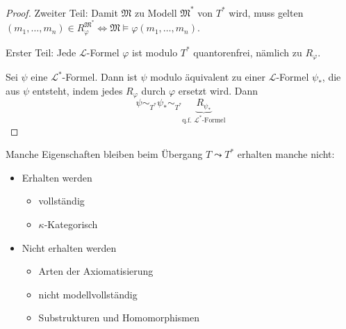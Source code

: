 \documentclass[12pt,parskip=full]{scrartcl}
\theoremstyle{definition}
\begin{document}
	\begin{proof}
		Zweiter Teil: Damit $\mathfrak{M}$ zu Modell $\mathfrak{M}^*$ von $T^*$ wird, muss gelten $(m_1, \dots, m_n) \in R_\varphi^{\mathfrak{M}^*} \Leftrightarrow \mathfrak{M} \models \varphi(m_1, \dots, m_n)$.
		
		Erster Teil: Jede $\mathcal{L}$-Formel $\varphi$ ist modulo $T^*$ quantorenfrei, nämlich zu $R_\varphi$.
		
		Sei $\psi$ eine $\mathcal{L}^*$-Formel. Dann ist $\psi$ modulo äquivalent zu einer $\mathcal{L}$-Formel $\psi_*$, die aus $\psi$ entsteht, indem jedes $R_\varphi$ durch $\varphi$ ersetzt wird. Dann
		\begin{equation*}
			\psi \sim_{T^*} \psi_* \sim_{T^*} \underbrace{R_{\psi_*}}_\text{q.f. $\mathcal{L}^*$-Formel}
		\end{equation*}
	\end{proof}

	Manche Eigenschaften bleiben beim Übergang $T \leadsto T^*$ erhalten manche nicht:
	\begin{itemize}
		\item Erhalten werden
		\begin{itemize}
			\item vollständig
			\item $\kappa$-Kategorisch
		\end{itemize}
		\item Nicht erhalten werden
		\begin{itemize}
			\item Arten der Axiomatisierung
			\item nicht modellvollständig
			\item Substrukturen und Homomorphismen
		\end{itemize}
	\end{itemize}
\end{document}
